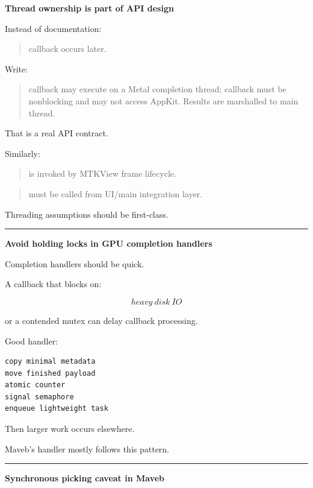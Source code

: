 \textbf{Thread ownership is part of API design}

Instead of documentation:

\begin{quote}
callback occurs later.
\end{quote}

Write:

\begin{quote}
callback may execute on a Metal completion thread; callback must be nonblocking and may not access AppKit. Results are marshalled to main thread.
\end{quote}

That is a real API contract.

Similarly:

\begin{quote}
 is invoked by MTKView frame lifecycle.
\end{quote}

\begin{quote}
 must be called from UI/main integration layer.
\end{quote}

Threading assumptions should be first-class.

\begin{center}\rule{0.5\linewidth}{0.5pt}\end{center}

\textbf{Avoid holding locks in GPU completion handlers}

Completion handlers should be quick.

A callback that blocks on:

\[
heavy\ disk\ IO
\]

or a contended mutex can delay callback processing.

Good handler:

\begin{verbatim}
copy minimal metadata
move finished payload
atomic counter
signal semaphore
enqueue lightweight task
\end{verbatim}

Then larger work occurs elsewhere.

Maveb's handler mostly follows this pattern.

\begin{center}\rule{0.5\linewidth}{0.5pt}\end{center}

\textbf{Synchronous picking caveat in Maveb}

